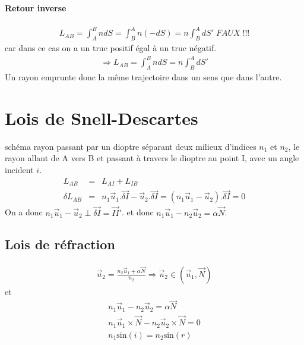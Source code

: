 \documentclass[12pt,prb,aps,epsf]{report}
\begin{document}
\paragraph{Retour inverse}
\begin{eqnarray}
L_{AB} =\int_A^BndS = \int_B^An(-dS) = n\int_B^AdS'\; FAUX\;!!!
\end{eqnarray}
car dans ce cas on a un truc positif égal à un truc négatif.
\begin{eqnarray}
\Rightarrow L_{AB} =\int_A^BndS = n\int_B^AdS'
\end{eqnarray}
Un rayon emprunte donc la même trajectoire dans un sens que dans l'autre.

\section{Lois de Snell-Descartes}
schéma rayon passant par un dioptre séparant deux milieux d'indices $n_1$ et $n_2$, le rayon allant de A vers B et passant à travers le dioptre au point I, avec un angle incident $i$.\\
\begin{eqnarray}
L_{AB} &=& L_{AI}+L_{IB}\\
\delta L_{AB} &=& n_1\vec{u}_1.\vec{\delta I} -\vec{u}_2.\vec{\delta I} = (n_1\vec{u}_1-\vec{u}_2).\vec{\delta I} = 0
\end{eqnarray}
On a donc $n_1\vec{u}_1-\vec{u}_2\perp \vec{\delta I}=\vec{II}'$. et donc $n_1\vec{u}_1-n_2\vec{u}_2= \alpha  \vec{N}$.

\subsection{Lois de réfraction}
\begin{eqnarray}
\vec{u}_2 = \frac{n_2\vec{u}_1+\alpha\vec{N}}{n_2} \Rightarrow \vec{u}_2 \in (\vec{u}_1,\vec{N})
\end{eqnarray}
et 
\begin{eqnarray}
n_1\vec{u}_1-n_2\vec{u}_2= \alpha  \vec{N}\\
n_1\vec{u}_1\times\vec{N}-n_2\vec{u}_2\times\vec{N}= 0\\
n_1 \mathrm{sin}(i) = n_2 \mathrm{sin}(r)
\end{eqnarray}
\end{document}
